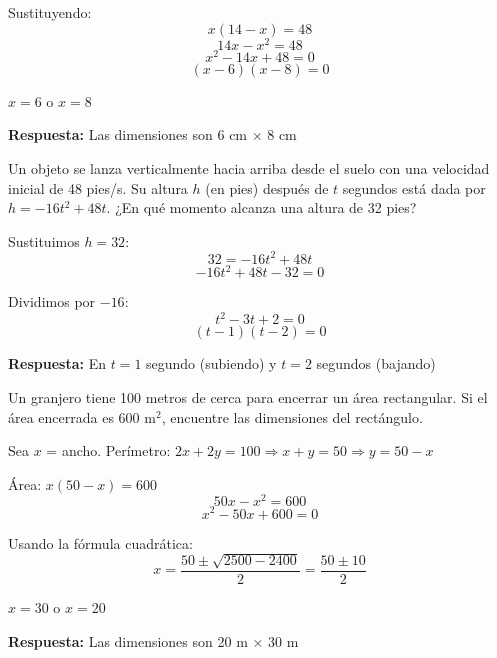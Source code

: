 \begin{exercise}
\begin{solucion}
Sustituyendo:
$$x(14 - x) = 48$$
$$14x - x^2 = 48$$
$$x^2 - 14x + 48 = 0$$
$$(x - 6)(x - 8) = 0$$

$x = 6$ o $x = 8$

\textbf{Respuesta:} Las dimensiones son 6 cm × 8 cm
\end{solucion}

\problem Un objeto se lanza verticalmente hacia arriba desde el suelo con una velocidad inicial de 48 pies/s. Su altura $h$ (en pies) después de $t$ segundos está dada por $h = -16t^2 + 48t$. ¿En qué momento alcanza una altura de 32 pies?

\begin{solucion}
Sustituimos $h = 32$:
$$32 = -16t^2 + 48t$$
$$-16t^2 + 48t - 32 = 0$$

Dividimos por $-16$:
$$t^2 - 3t + 2 = 0$$
$$(t - 1)(t - 2) = 0$$

\textbf{Respuesta:} En $t = 1$ segundo (subiendo) y $t = 2$ segundos (bajando)
\end{solucion}

\problem Un granjero tiene 100 metros de cerca para encerrar un área rectangular. Si el área encerrada es 600 m$^2$, encuentre las dimensiones del rectángulo.

\begin{solucion}
Sea $x$ = ancho. Perímetro: $2x + 2y = 100 \Rightarrow x + y = 50 \Rightarrow y = 50 - x$

Área: $x(50 - x) = 600$
$$50x - x^2 = 600$$
$$x^2 - 50x + 600 = 0$$

Usando la fórmula cuadrática:
$$x = \frac{50 \pm \sqrt{2500 - 2400}}{2} = \frac{50 \pm 10}{2}$$

$x = 30$ o $x = 20$

\textbf{Respuesta:} Las dimensiones son 20 m × 30 m
\end{solucion}
\end{exercise}


